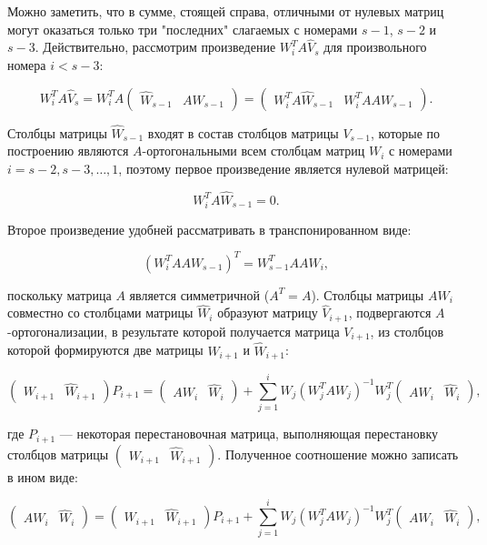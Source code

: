 Можно заметить, что в сумме, стоящей справа, отличными от нулевых матриц могут оказаться только три "последних"{} слагаемых
с номерами $s-1$, $s-2$ и $s-3$. Действительно, рассмотрим произведение $W_i^T A \widehat{V}_s$ для произвольного номера $i < s-3$:

$$
	W_i^T A \widehat{V}_s
		= W_i^T A \begin{pmatrix} \widehat{W}_{s-1} & A W_{s-1} \end{pmatrix}
		= \begin{pmatrix} W_i^T A \widehat{W}_{s-1} & W_i^T A A W_{s-1} \end{pmatrix}.
$$

Столбцы матрицы $\widehat{W}_{s-1}$ входят в состав столбцов матрицы $V_{s-1}$, которые по построению являются $A$-ортогональными всем
столбцам матриц $W_i$ с номерами $i = s-2, s-3, \dots, 1$, поэтому первое произведение является нулевой матрицей:

$$
	W_i^T A \widehat{W}_{s-1} = 0.
$$

Второе произведение удобней рассматривать в транспонированном виде:

$$
	\left ( W_i^T A A W_{s-1} \right ) ^T = W_{s-1}^T A A W_i,
$$

поскольку матрица $A$ является симметричной ($A^T = A$). Столбцы матрицы $A W_i$ совместно со столбцами матрицы $\widehat{W}_i$
образуют матрицу $\widehat{V}_{i+1}$, подвергаются $A$-ортогонализации, в результате которой получается матрица $V_{i+1}$,
из столбцов которой формируются две матрицы $W_{i+1}$ и $\widehat{W}_{i+1}$:

$$
	\begin{pmatrix}
		W_{i+1} & \widehat{W}_{i+1}
	\end{pmatrix}
	P_{i+1}
	=
	\begin{pmatrix}
		A W_i & \widehat{W}_i
	\end{pmatrix}
	+
	\sum_{j=1}^i W_j \left ( W_j^T A W_j \right ) ^{-1} W_j^T \begin{pmatrix}	A W_i & \widehat{W}_i \end{pmatrix},
$$

где $P_{i+1}$ --- некоторая перестановочная матрица, выполняющая перестановку столбцов матрицы
$\begin{pmatrix} W_{i+1} & \widehat{W}_{i+1} \end{pmatrix}$. Полученное соотношение можно записать в ином виде:

$$
	\begin{pmatrix}
		A W_i & \widehat{W}_i
	\end{pmatrix}
	=
	\begin{pmatrix}
		W_{i+1} & \widehat{W}_{i+1}
	\end{pmatrix}
	P_{i+1}
	+
	\sum_{j=1}^i W_j \left ( W_j^T A W_j \right ) ^{-1} W_j^T \begin{pmatrix} A W_i & \widehat{W}_i \end{pmatrix},
$$

